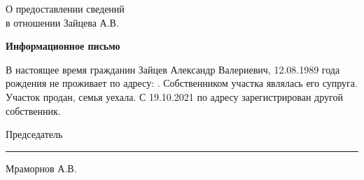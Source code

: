 \begin{flushleft}
	\vspace{10mm}
О предоставлении сведений\\
в отношении Зайцева  А.В.
\end{flushleft}
\vspace{7mm}
\begin{center}
	\Large\textbf{Информационное письмо}
\end{center}
\par

В настоящее время гражданин Зайцев Александр Валериевич, 12.08.1989 года рождения не проживает по адресу: . Собственником участка являлась его супруга. Участок продан, семья уехала. С 19.10.2021   по  адресу зарегистрирован другой собственник. 

\vspace{35mm}
Председатель \hfill    \rule{4cm}{0.1 mm}    Мраморнов А.В.




